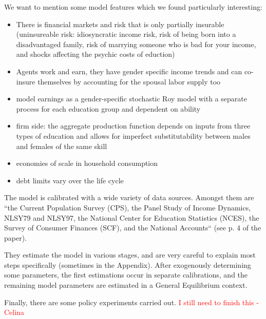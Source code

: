 \documentclass[12pt,a4paper,xcolor=dvipsnames]{article}
\begin{document}
We want to mention some model features which we found particularly interesting:
\begin{itemize}
    \item There is financial markets and risk that is only partially insurable (uninsureable risk: idiosyncratic income risk, risk of being born into a disadvantaged family, risk of marrying someone who is bad for your income, and shocks affecting the psychic costs of eduction)
    \item Agents work and earn, they have gender specific income trends and can co-insure themselves by accounting for the spousal labor supply too
    \item model earnings as a gender-specific stochastic Roy model with a separate process for each education group and dependent on ability
    \item firm side: the aggregate production function depends on inputs from three types of education and allows for imperfect substitutability between males and females of the same skill
    \item economies of scale in household consumption
    \item debt limits vary over the life cycle
\end{itemize}

The model is calibrated with a wide variety of data sources. Amongst them are “the Current Population Survey (CPS), the Panel Study of Income Dynamics, NLSY79 and NLSY97, the National Center for Education Statistics (NCES), the Survey of Consumer Finances (SCF), and the National Accounts“ (see p. 4 of the paper). 

They estimate the model in various stages, and are very careful to explain most steps specifically (sometimes in the Appendix). After exogenously determining some parameters, the first estimations occur in separate calibrations, and the remaining model parameters are estimated in a General Equilibrium context. 

Finally, there are some policy experiments carried out. \textcolor{red}{I still need to finish this - Celina}


\pagebreak
\end{document}
